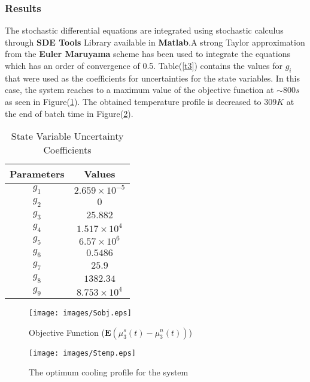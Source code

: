 \documentclass[3p,times,authoryear]{elsarticle}
\begin{document}
\subsubsection{Results}
The stochastic differential equations are integrated using stochastic calculus through \textbf{SDE Tools} Library available in \textbf{Matlab}.A strong Taylor approximation from the \textbf{Euler Maruyama} scheme has been used to integrate the equations which has an order of convergence of 0.5. Table(\ref{t3}) contains the values for $g_{i}$ that were used as the coefficients for uncertainties for the state variables. In this case, the system reaches to a maximum value of the objective function at $\sim 800 s$ as seen in Figure(\ref{Sobj}). The obtained temperature profile is decreased to $309 K$ at the end of batch time in Figure(\ref{Stemp}). 
\begin{center}
\begin{table}[!h] 
\centering
\caption{State Variable Uncertainty Coefficients\cite{yenkie}} \label{t3}
\begin{tabular}{|c|c|}
\hline
Parameters & Values \\
\hline
$g_{1}$ & $2.659\times10^{-5}$ \\
$g_{2}$ & $0$ \\
$g_{3}$ & $25.882$ \\
$g_{4}$ & $1.517\times10^{4}$ \\ 
$g_{5}$ & $6.57\times10^{6}$ \\
$g_{6}$ & $0.5486$ \\
$g_{7}$ & $25.9$\\
$g_{8}$ & $1382.34$ \\
$g_{9}$ & $8.753\times10^{4}$ \\
\hline
\end{tabular}

\label{Table2}
\end{table}
\end{center}

\begin{figure}[h!]

\begin{center}
\texttt{[image: images/Sobj.eps]}
\end{center}
\caption{Objective Function ($\mathbf{E}\left(\mu_{3}^{s}(t) - \mu_{3}^{n}(t)\right)$)} \label{Sobj}
\end{figure}
\begin{figure}[h!] 

\begin{center}
\texttt{[image: images/Stemp.eps]}
\end{center}
\caption{The optimum cooling profile for the system} \label{Stemp}
\end{figure}
\end{document}

